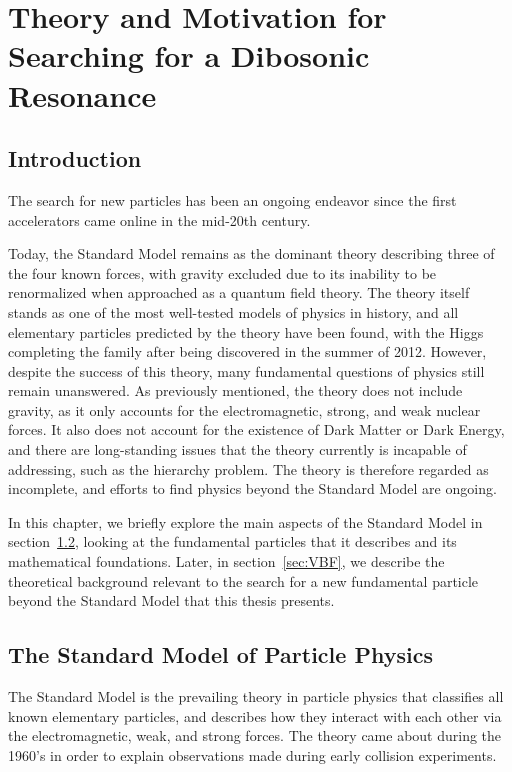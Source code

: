 
\chapter{Theory and Motivation for Searching for a Dibosonic Resonance}
\label{chap:theory}

\section{Introduction}

The search for new particles has been an ongoing endeavor since the first accelerators came online in the mid-20th century.

Today, the Standard Model remains as the dominant theory describing three of the four known forces, with gravity excluded due to its inability to be renormalized when approached as a quantum field theory.
The theory itself stands as one of the most well-tested models of physics in history, and all elementary particles predicted by the theory have been found, with the Higgs completing the family after being discovered in the summer of 2012.
However, despite the success of this theory, many fundamental questions of physics still remain unanswered.
As previously mentioned, the theory does not include gravity, as it only accounts for the electromagnetic, strong, and weak nuclear forces.
It also does not account for the existence of Dark Matter or Dark Energy, and there are long-standing issues that the theory currently is incapable of addressing, such as the hierarchy problem.
The theory is therefore regarded as incomplete, and efforts to find physics beyond the Standard Model are ongoing.

In this chapter, we briefly explore the main aspects of the Standard Model in section~\ref{sec:SM}, looking at the fundamental particles that it describes and its mathematical foundations.
Later, in section~\ref{sec:VBF}, we describe the theoretical background relevant to the search for a new fundamental particle beyond the Standard Model that this thesis presents.

\section{The Standard Model of Particle Physics}
\label{sec:SM}

The Standard Model is the prevailing theory in particle physics that classifies all known elementary particles, and describes how they interact with each other via the electromagnetic, weak, and strong forces.
The theory came about during the 1960's in order to explain observations made during early collision experiments\footnotemark.

